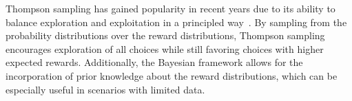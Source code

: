 Thompson sampling has gained popularity in recent years due to its ability to balance exploration and exploitation in a
principled way~\cite{park2021analysis}.
By sampling from the probability distributions over the reward distributions, Thompson sampling encourages exploration
of all choices while still favoring choices with higher expected rewards.
Additionally, the Bayesian framework allows for the incorporation of prior knowledge about the reward distributions,
which can be especially useful in scenarios with limited data.